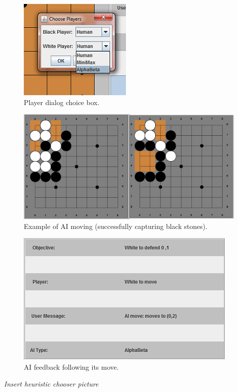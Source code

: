 \documentclass{l3proj}
\begin{document}
\begin{figure}[H]
\centering
\includegraphics[scale=1]{Images/GUI-8-PlayerChoice.png}
\caption{Player dialog choice box.}
\end{figure}

\begin{figure}[H]
\centering
\includegraphics[scale=0.5]{Images/GUI-9-AIMove1.png}
\caption{Example of AI moving (successfully capturing black stones).}
\end{figure}

\begin{figure}[H]
\centering
\includegraphics[scale=1]{Images/GUI-11-AIMove3Feedback.png}
\caption{AI feedback following its move.}
\end{figure}

\textit{Insert heuristic chooser picture}
\end{document}
